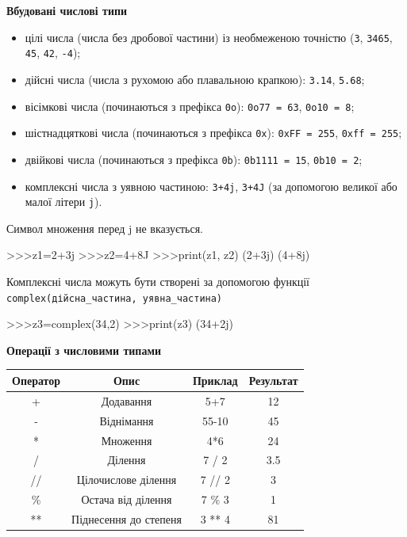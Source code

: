 	
	\hspace{5cm}\textbf{Вбудовані числові типи}
	\begin{itemize}
	\item цілі числа (числа без дробової частини) із необмеженою точністю (\texttt{3}, \texttt{3465}, \texttt{45}, \texttt{42}, \texttt{-4});
	\item дійсні числа (числа з рухомою або плавальною крапкою): \texttt{3.14}, \texttt{5.68};
	\item вісімкові числа (починаються з префікса \texttt{0o}): \texttt{0o77 = 63}, \texttt{0o10 = 8};
	\item шістнадцяткові числа (починаються з префікса \texttt{0x}): \texttt{0xFF = 255}, \texttt{0xff = 255};
	\item двійкові числа (починаються з префікса \texttt{0b}): \texttt{0b1111 = 15}, \texttt{0b10 = 2};
	\item комплексні числа з уявною частиною: \texttt{3+4j}, \texttt{3+4J} (за допомогою великої або малої літери \texttt{j}).
	\end{itemize}
	Символ множення перед j не вказується.
	\begin{pydef} 
>>>z1=2+3j
>>>z2=4+8J
>>>print(z1, z2)
(2+3j) (4+8j)
	\end{pydef}
	
	Комплексні числа можуть бути створені за допомогою функції \texttt{complex(дійсна\_частина, уявна\_частина)}\\
	
	\begin{pydef} 
>>>z3=complex(34,2)
>>>print(z3)
(34+2j)
	\end{pydef}
	
	\textbf{Операції з числовими типами}\\
	
	\begin{tabular}{|c|c|c|c|} 
	\hline
	\textbf{Оператор} & \textbf{Опис}&\textbf{Приклад}&\textbf{Результат}\\ \hline
	+ & Додавання&5+7&12\\ \hline
	-&Віднімання&55-10&45\\ \hline 
	*& Множення& 4*6 &24\\ \hline
	/& Ділення &7 / 2 &3.5\\ \hline
	//& Цілочислове ділення& 7 // 2& 3\\ \hline
	\%& Остача від ділення& 7 \%  3 &1\\ \hline
	**& Піднесення до степеня& 3 ** 4 &81\\ \hline
	
	\end{tabular}
	\\
	
